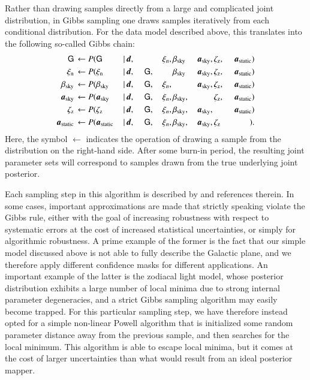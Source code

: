 \documentclass{aa}
\newcommand{\dv}[0]{\vec{d}}
\newcommand{\G}[0]{\tens{G}}
\renewcommand{\a}[0]{\vec{a}}
\begin{document}
Rather than drawing samples
directly from a large and complicated joint distribution, in Gibbs sampling one
draws samples iteratively from each conditional distribution. For the
data model described above, this translates into the following
so-called Gibbs chain:
\begin{alignat}{11}
\G &\,\leftarrow P(\G&\,\mid &\,\dv,&\, &\,\phantom{\G} &\,\xi_n, &
\,\beta_{\mathrm{sky}}& \,\a_{\mathrm{sky}}, &\,\zeta_{\mathrm{z}},
&\,\a_{\mathrm{static}})\label{eq:gibbs_G}\\
\xi_{\mathrm{n}} &\,\leftarrow P(\xi_{\mathrm{n}}&\,\mid &\,\dv,&\, &\,\G, &\,\phantom{\xi_n} &
\,\beta_{\mathrm{sky}}& \,\a_{\mathrm{sky}}, &\,\zeta_{\mathrm{z}},
&\,\a_{\mathrm{static}})\\
\beta_{\mathrm{sky}} &\,\leftarrow P(\beta_{\mathrm{sky}}&\,\mid &\,\dv,&\, &\,\G, &\,\xi_n, &
\,\phantom{\beta_{\mathrm{sky}}}& \,\a_{\mathrm{sky}}, &\,\zeta_{\mathrm{z}}, &\,\a_{\mathrm{static}})\\
\a_{\mathrm{sky}} &\,\leftarrow P(\a_{\mathrm{sky}}&\,\mid &\,\dv,&\, &\,\G, &\,\xi_n, &
\,\beta_{\mathrm{sky}},& \,\phantom{\a_{\mathrm{sky}},}
&\,\zeta_{\mathrm{z}}, &\,\a_{\mathrm{static}})\\
\zeta_{\mathrm{z}} &\,\leftarrow P(\zeta_{\mathrm{z}}&\,\mid &\,\dv,&\, &\,\G, &\,\xi_n, &
\,\beta_{\mathrm{sky}},& \,\a_{\mathrm{sky}},
&\,\phantom{\zeta_{\mathrm{z}},} &\,\a_{\mathrm{static}})\label{eq:gibbs_zodi}\\
\a_{\mathrm{static}} &\,\leftarrow P(\a_{\mathrm{static}}&\,\mid &\,\dv,&\, &\,\G, &\,\xi_n, &
\,\beta_{\mathrm{sky}},& \,\a_{\mathrm{sky}}, &\,\zeta_{\mathrm{z}} &\,\phantom{\a_{\mathrm{static}}})\label{eq:gibbs_static}.
\end{alignat}
Here, the symbol $\leftarrow$ indicates the operation of drawing a
sample from the distribution on the right-hand side. After some
burn-in period, the resulting joint parameter sets will correspond to
samples drawn from the true underlying joint posterior.


Each sampling step in this algorithm is described by \citet{CG02_01}
and references therein. In some cases, important 
approximations are made that strictly speaking violate the Gibbs
rule, either with the goal of increasing robustness with respect to
systematic errors at the cost of increased statistical uncertainties,
or simply for algorithmic robustness. A prime example of the former is
the fact that our simple model discussed above is not able to fully
describe the Galactic plane, and we therefore apply different
confidence masks for different applications. An important example of
the latter is the zodiacal light model, whose posterior distribution
exhibits a large number of local minima due to strong internal
parameter degeneracies, and a strict Gibbs sampling algorithm may
easily become trapped. For this particular sampling step, we have
therefore instead opted for a simple non-linear Powell algorithm that
is initialized some random parameter distance away from the previous
sample, and then searches for the local minimum. This algorithm is
able to escape local minima, but it comes at the cost of larger
uncertainties than what would result from an ideal posterior mapper.
\end{document}

